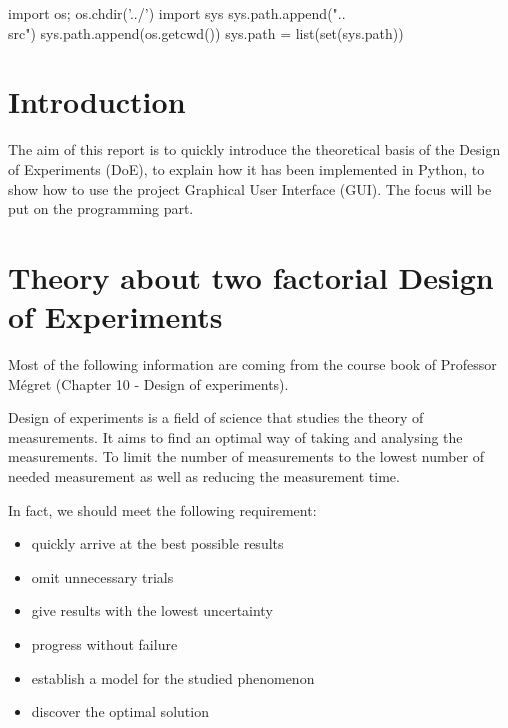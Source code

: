 \documentclass[english, 12 pt, openany, oneside]{book}
\begin{document}
\begin{pyconcode}
import os;
os.chdir('../')
import sys
sys.path.append("..\\src")
sys.path.append(os.getcwd())
sys.path = list(set(sys.path))
\end{pyconcode}

\umonsCoverPage

\frontmatter
\tableofcontents


\mainmatter
{}
\chapter*{Introduction}
The aim of this report is to quickly introduce the theoretical basis of the Design of Experiments (DoE), to explain how it has been implemented in Python, to show how to use the project Graphical User Interface (GUI). The focus will be put on the programming part.

\chapter{Theory about two factorial Design of Experiments}
Most of the following information are coming from the course book\cite{patrice_megret_industrial_nodate} of Professor Mégret (Chapter 10 - Design of experiments).

Design of experiments is a field of science that studies the theory of measurements. It aims to find an optimal way of taking and analysing the measurements. To limit the number of measurements to the lowest number of needed measurement as well as reducing the measurement time.

In fact, we should meet the following requirement:

\begin{itemize}
\item quickly arrive at the best possible results
\item omit unnecessary trials
\item give results with the lowest uncertainty
\item progress without failure
\item establish a model for the studied phenomenon
\item discover the optimal solution
\end{itemize}
\end{document}
